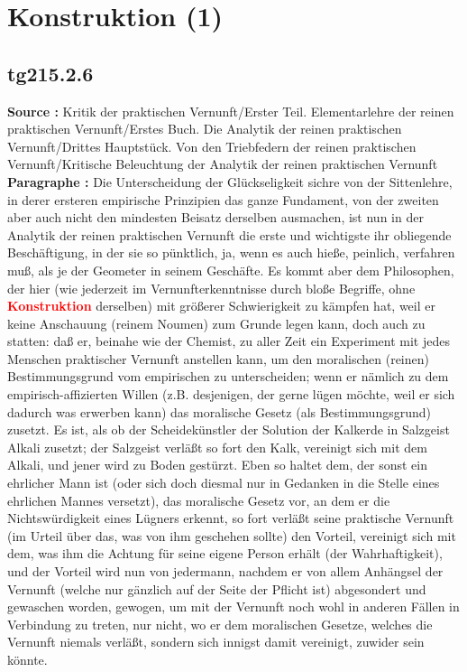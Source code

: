 \documentclass[a4paper,12pt,twoside]{book}
\newcommand{\match}[1]{\textcolor{red}{\textbf{#1}}}
\newcommand{\unnumberedsection}[1]{
	\section*{#1}
	\addcontentsline{toc}{section}{#1}
	\markright{#1}
}
\begin{document}
	\unnumberedsection{Konstruktion (1)} 
	\subsection*{tg215.2.6} 
	\textbf{Source : }Kritik der praktischen Vernunft/Erster Teil. Elementarlehre der reinen praktischen Vernunft/Erstes Buch. Die Analytik der reinen praktischen Vernunft/Drittes Hauptstück. Von den Triebfedern der reinen praktischen Vernunft/Kritische Beleuchtung der Analytik der reinen praktischen Vernunft\\  
	
	\textbf{Paragraphe : }Die Unterscheidung der Glückseligkeit sichre von der Sittenlehre, in derer ersteren empirische Prinzipien das ganze Fundament, von der zweiten aber auch nicht den mindesten Beisatz derselben ausmachen, ist nun in der Analytik der reinen praktischen Vernunft die erste und wichtigste ihr obliegende Beschäftigung, in der sie so pünktlich, ja, wenn es auch hieße, peinlich, verfahren muß, als je der Geometer in seinem Geschäfte. Es kommt aber dem Philosophen, der hier (wie jederzeit im Vernunfterkenntnisse durch bloße Begriffe, ohne \match{Konstruktion} derselben) mit größerer Schwierigkeit zu kämpfen hat, weil er keine Anschauung  (reinem Noumen) zum Grunde legen kann, doch auch zu statten: daß er, beinahe wie der Chemist, zu aller Zeit ein Experiment mit jedes Menschen praktischer Vernunft anstellen kann, um den moralischen (reinen) Bestimmungsgrund vom empirischen zu unterscheiden; wenn er nämlich zu dem empirisch-affizierten Willen (z.B. desjenigen, der gerne lügen möchte, weil er sich dadurch was erwerben kann) das moralische Gesetz (als Bestimmungsgrund) zusetzt. Es ist, als ob der Scheidekünstler der Solution der Kalkerde in Salzgeist Alkali zusetzt; der Salzgeist verläßt so fort den Kalk, vereinigt sich mit dem Alkali, und jener wird zu Boden gestürzt. Eben so haltet dem, der sonst ein ehrlicher Mann ist (oder sich doch diesmal nur in Gedanken in die Stelle eines ehrlichen Mannes versetzt), das moralische Gesetz vor, an dem er die Nichtswürdigkeit eines Lügners erkennt, so fort verläßt seine praktische Vernunft (im Urteil über das, was von ihm geschehen sollte) den Vorteil, vereinigt sich mit dem, was ihm die Achtung für seine eigene Person erhält (der Wahrhaftigkeit), und der Vorteil wird nun von jedermann, nachdem er von allem Anhängsel der Vernunft (welche nur gänzlich auf der Seite der Pflicht ist) abgesondert und gewaschen worden, gewogen, um mit der Vernunft noch wohl in anderen Fällen in Verbindung zu treten, nur nicht, wo er dem moralischen Gesetze, welches die Vernunft niemals verläßt, sondern sich innigst damit vereinigt, zuwider sein könnte. 
	
\end{document}
